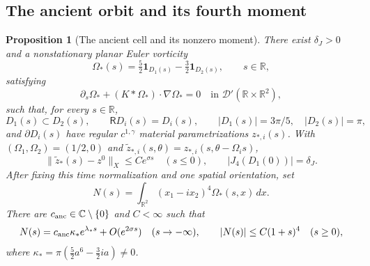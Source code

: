 \documentclass[11pt]{amsart}
\newtheorem{proposition}[theorem]{Proposition}
\theoremstyle{remark}
\numberwithin{equation}{section}
\newcommand{\R}{\mathbb R}
\newcommand{\C}{\mathbb C}
\begin{document}
\subsection{The ancient orbit and its fourth moment}

\begin{proposition}[The ancient cell and its nonzero moment]
\label{pc:ancient-cell}
There exist $\delta_J>0$ and a nonstationary planar Euler vorticity
\[
 \Omega_*(s)=\tfrac52\mathbf1_{D_1(s)}-\tfrac32\mathbf1_{D_2(s)},
 \qquad s\in\R,
\]
satisfying
\[
 \partial_s\Omega_*+(K*\Omega_*)\cdot\nabla\Omega_*=0
       \quad\text{in }\mathcal D'(\R\times\R^2),
\]
such that, for every $s\in\R$,
\[
 D_1(s)\subset D_2(s),\qquad \mathsf RD_i(s)=D_i(s),\qquad
 |D_1(s)|=3\pi/5,\quad |D_2(s)|=\pi,
\]
and $\partial D_i(s)$ have regular $c^{1,\gamma}$ material
parametrizations $z_{*,i}(s)$. With
$(\Omega_1,\Omega_2)=(1/2,0)$ and
$\widetilde z_{*,i}(s,\theta)=z_{*,i}(s,\theta-\Omega_i s)$,
\[
 \|\widetilde z_*(s)-z^0\|_X\le Ce^{\sigma s}\quad(s\le0),
 \qquad |J_4(D_1(0))|=\delta_J.
\]
After fixing this time normalization and one spatial orientation, set
\[
 N(s)=\int_{\R^2}(x_1-ix_2)^4\Omega_*(s,x)\,dx.
\]
There are $c_{\rm anc}\in\C\setminus\{0\}$ and $C<\infty$ such that
\[
 N(s)=c_{\rm anc}\kappa_*e^{\lambda_*s}+O(e^{2\sigma s})
       \quad(s\to-\infty),\qquad
 |N(s)|\le C(1+s)^4\quad(s\ge0),
\]
where $\kappa_*=\pi(\tfrac52a^6-\tfrac32ia)\ne0$.
\end{proposition}
\end{document}
